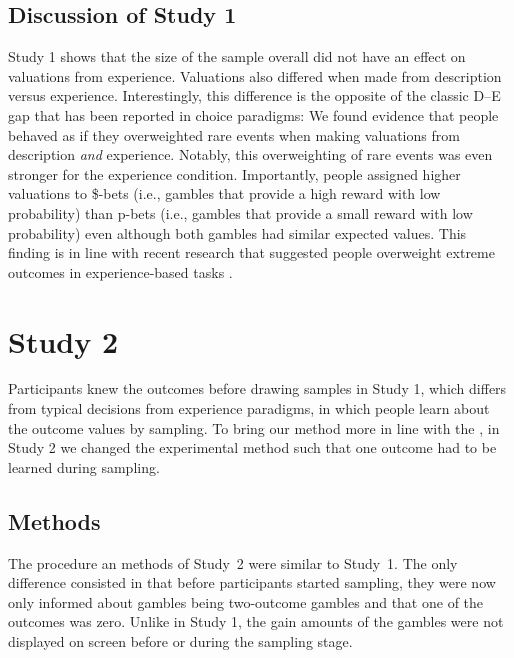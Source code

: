 \documentclass[a4paper, man, natbib, floatsintext]{apa6}
\begin{document}


\subsection{Discussion of Study 1}

Study 1 shows that the size of the sample overall did not have an effect on valuations from experience.  Valuations also differed when made from description versus experience. Interestingly, this difference is the opposite of the classic D--E gap that has been reported in choice paradigms: We found evidence that people behaved as if they overweighted rare events when making valuations from description \textit{and} experience. Notably, this overweighting of rare events was even stronger for the experience condition. Importantly, people assigned higher valuations to \$-bets (i.e., gambles that provide a high reward with low probability) than p-bets (i.e., gambles that provide a small reward with low probability) even although both gambles had similar expected values. This finding is in line with recent research that suggested people overweight extreme outcomes in experience-based tasks \citep{Ludvig2017}.

\section{Study 2}
Participants knew the outcomes before drawing samples in Study 1, which differs from typical decisions from experience paradigms, in which people learn about the outcome values by sampling. To bring our method more in line with the , in Study 2 we changed the experimental method such that one outcome had to be learned during sampling.

\subsection{Methods}
The procedure an methods of Study~2 were similar to Study~1. The only difference consisted in that before participants started sampling, they were now only informed about gambles being two-outcome gambles and that one of the outcomes was zero. Unlike in Study 1, the gain amounts of the gambles were not displayed on screen before or during the sampling stage.
\end{document}
